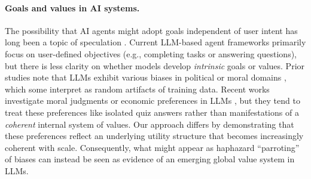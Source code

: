 \paragraph{Goals and values in AI systems.} The possibility that AI agents might adopt goals independent of user intent has long been a topic of speculation \citep{shah2022goal}. Current LLM-based agent frameworks primarily focus on user-defined objectives (e.g., completing tasks or answering questions), but there is less clarity on whether models develop \emph{intrinsic} goals or values. Prior studies note that LLMs exhibit various biases \citep{tamkin2023evaluatingmitigatingdiscriminationlanguage, nadeem2020stereosetmeasuringstereotypicalbias} in political or moral domains \citep{potter2024hidden}, which some interpret as random artifacts of training data. Recent works investigate moral judgments or economic preferences in LLMs \citep{rozen2024llmsconsistentvalues,moore-etal-2024-large,chiu2024dailydilemmasrevealingvaluepreferences, raman2024steerassessingeconomicrationality}, but they tend to treat these preferences like isolated quiz answers rather than manifestations of a \emph{coherent} internal system of values. Our approach differs by demonstrating that these preferences reflect an underlying utility structure that becomes increasingly coherent with scale. Consequently, what might appear as haphazard ``parroting'' of biases can instead be seen as evidence of an emerging global value system in LLMs.

